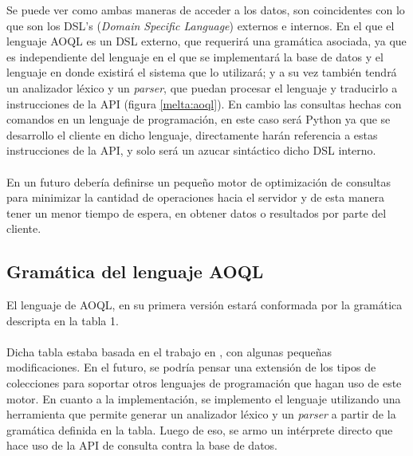 \documentclass{melta}
\begin{document}
Se puede ver como ambas maneras de acceder a los datos, son coincidentes con lo que son los DSL's (\textit{Domain Specific Language}) externos e internos. En el que el lenguaje AOQL es un DSL externo, que requerirá una gramática asociada, ya que es independiente del lenguaje en el que se implementará la base de datos y el lenguaje en donde existirá el sistema que lo utilizará; y a su vez también tendrá un analizador léxico y un \textit{parser}, que puedan procesar el lenguaje y traducirlo a instrucciones de la API (figura \ref{melta:aoql}). En cambio las consultas hechas con comandos en un lenguaje de programación, en este caso será Python ya que se desarrollo el cliente en dicho lenguaje, directamente harán referencia a estas instrucciones de la API, y solo será un azucar sintáctico dicho DSL interno.
\\\\
En un futuro debería definirse un pequeño motor de optimización de consultas para minimizar la cantidad de operaciones hacia el servidor y de esta manera tener un menor tiempo de espera, en obtener datos o resultados por parte del cliente.

\subsection{Gramática del lenguaje AOQL}

El lenguaje de AOQL, en su primera versión estará conformada por la gramática descripta en la tabla 1.
\\\\
Dicha tabla estaba basada en el trabajo en \cite{OMG:oodbs}, con algunas pequeñas modificaciones. En el futuro, se podría pensar una extensión de los tipos de colecciones para soportar otros lenguajes de programación que hagan uso de este motor. En cuanto a la implementación, se implemento el lenguaje utilizando una herramienta que permite generar un analizador léxico y un \textit{parser} a partir de la gramática definida en la tabla. Luego de eso, se armo un intérprete directo que hace uso de la API de consulta contra la base de datos.
\end{document}
